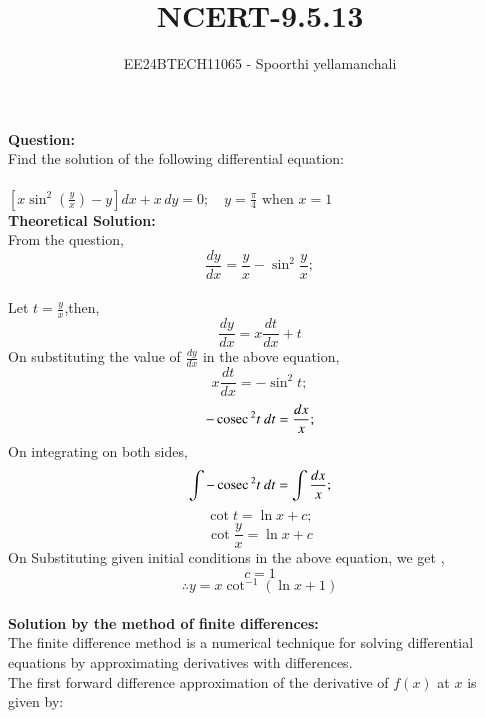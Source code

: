 \documentclass[journal]{IEEEtran}
\begin{document}

\vspace{3cm}

\title{NCERT-9.5.13}
\author{EE24BTECH11065 - Spoorthi yellamanchali
}
{\let\newpage\relax\maketitle}

\renewcommand{\thefigure}{\theenumi}
\renewcommand{\thetable}{\theenumi}
\setlength{\intextsep}{10pt} %


\renewcommand{\thetable}{\theenumi}


\textbf{Question:}
\\
Find the solution of the following differential equation:\\
\\ $\left[ x \sin^2 \left( \frac{y}{x} \right) - y \right] dx + x \, dy = 0; \quad y = \frac{\pi}{4} \text{ when } x = 1$ \\


\textbf{ Theoretical Solution: }
\\
From the question,
\\
\[
\frac{dy}{dx} = \frac{y}{x} - \sin^2{\frac{y}{x}};
\]
\\
Let $t = \frac{y}{x}$,then,
\\
\[
\frac{dy}{dx} = x\frac{dt}{dx} + t
\]
On substituting the value of $\frac{dy}{dx}$ in the above equation,
\[
x\frac{dt}{dx} = -\sin^2{t};
\]
\[
-\,\text{cosec}\,^2{t}\ dt = \frac{dx}{x};
\]
On integrating on both sides,
\[
\int -\,\text{cosec}\,^2{t}\ dt = \int \frac{dx}{x};
\]
\[
\cot{t} = \ln{x} + c;
\]
\[
\cot{\frac{y}{x}} = \ln{x} + c
\]
On Substituting given initial conditions in the above equation,
we get ,
\[
c = 1
\]
\[
\therefore y = x\cot^{-1}{(\ln{x} + 1)}
\]
\\
\textbf{Solution by the method of finite differences:}
\\
The finite difference method is a numerical technique for solving differential equations by approximating derivatives with differences.\\
The first forward difference approximation of the derivative of $f(x)$ at $x$ is given by: \\
\end{document}
